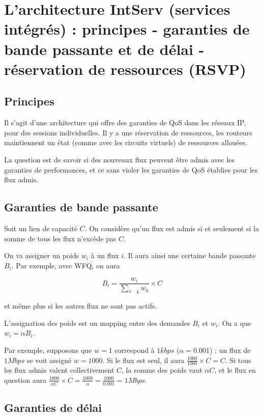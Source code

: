 \chapter{L'architecture IntServ (services intégrés) : principes - garanties de bande passante et de délai - réservation de ressources (RSVP)}

		\section{Principes}
Il s'agit d'une architecture qui offre des garanties de QoS dans les réseaux IP, pour des sessions individuelles. Il y a une réservation de ressources, les routeurs maintiennent un état (comme avec les circuits virtuels) de ressources allouées.
			
			La question est de savoir si des nouveaux flux peuvent être admis avec les garanties de performances, et ce sans violer les garanties de QoS établies pour les flux admis.
		
		\section{Garanties de bande passante}
		
		Soit un lien de capacité $C$. On considère qu'un flux est admis si et seulement si la somme de tous les flux n'excède pas $C$.
		
		On va assigner un poids $w_i$ à un flux $i$. Il aura ainsi une certaine bande passante $B_i$. Par exemple, avec WFQ, on aura
		
		$$B_i = \frac{w_i}{\sum_{\forall \quad k} w_k} \times C$$
		
		et même plus si les autres flux ne sont pas actifs.
		
		L'assignation des poids est un mapping entre des demandes $B_i$ et $w_i$. On a que $w_i = \alpha B_i$.
		
		Par exemple, supposons que $w=1$ correspond à $1kbps$ ($\alpha = 0.001$) ; un flux de $1Mbps$ se voit assigné $w = 1000$. Si le flux est seul, il aura $\frac{1000}{1000} \times C = C$. Si tous les flux admis valent collectivement $C$, la somme des poids vaut $\alpha C$, et le flux en question aura $\frac{1000}{\alpha C} \times C = \frac{1000}{\alpha} = \frac{1000}{0.001} = 1Mbps$.
		
		
		\section{Garanties de délai}
		
